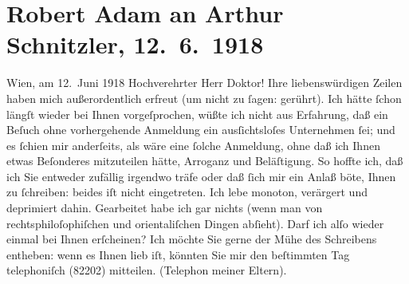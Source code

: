 

               \section[Robert Adam an Arthur Schnitzler, 12. 6. 1918]{ Robert Adam an Arthur Schnitzler, 12. 6. 1918}\nopagebreak{}\rehead{ }\begin{ledgroupsized}[t]{13cm}\normalsize\beginnumbering{} \toendnotes[C]{\smallbreak\pagebreak[2]} 
\toendnotes[C]{\smallbreak}\pstart
           \raggedleft{}{\pb}Wien, am 12. Juni 1918\pend
           \pstart\center{}Hochverehrter Herr Doktor!\pend\pstart
           Ihre liebenswürdigen Zeilen haben mich außerordentlich erfreut (um nicht zu
                    ſagen: gerührt). Ich hätte ſchon längſt wieder bei Ihnen vorgeſprochen, wüßte
                    ich nicht aus Erfahrung, daß ein Beſuch ohne vorhergehende Anmeldung ein
                    ausſichtsloſes Unternehmen ſei; und es ſchien mir anderſeits, als wäre eine
                    ſolche Anmeldung, ohne daß ich Ihnen etwas Beſonderes mitzuteilen hätte,
                    Arroganz und Beläſtigung. So hoffte ich, daß ich Sie entweder zufällig irgendwo
                    träfe oder daß ſich mir ein Anlaß böte, Ihnen zu ſchreiben: beides iſt nicht
                    eingetreten.\pend
           \pstart
           Ich lebe monoton, verärgert und {\pb}deprimiert dahin. Gearbeitet habe ich gar nichts (wenn man von
                    rechtsphiloſophiſchen und orientaliſchen Dingen abſieht).\pend
           \pstart
           Darf ich alſo wieder einmal bei Ihnen erſcheinen? Ich möchte Sie gerne der Mühe
                    des Schreibens entheben: wenn es Ihnen lieb iſt, könnten Sie mir den beſtimmten
                    Tag telephoniſch (82202) mitteilen. (Telephon meiner Eltern).\pend

\end{ledgroupsized}
